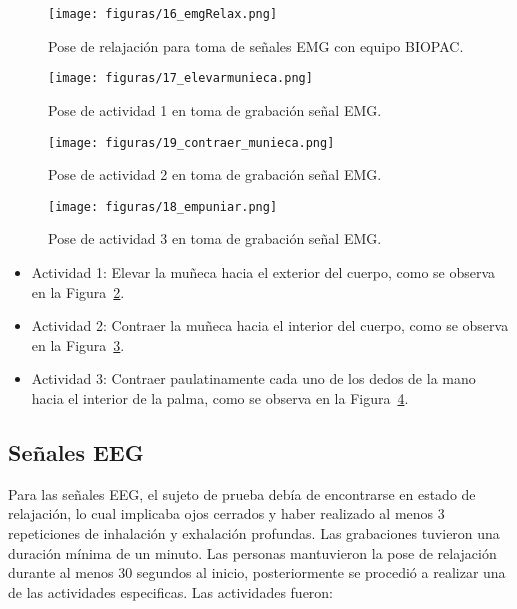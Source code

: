 \begin{figure}[t]
    \centering
    \texttt{[image: figuras/16\_emgRelax.png]}
    \caption{Pose de relajación para toma de señales EMG con equipo BIOPAC.}
    \label{fig:relax_emg}
\end{figure}

\begin{figure}[t]
    \centering
    \texttt{[image: figuras/17\_elevarmunieca.png]}
    \caption{Pose de actividad 1 en toma de grabación señal EMG.}
    \label{fig:actividad1_emg}
\end{figure}

\begin{figure}[H]
    \centering
    \texttt{[image: figuras/19\_contraer\_munieca.png]}
    \caption{Pose de actividad 2 en toma de grabación señal EMG.}
    \label{fig:actividad2_emg}
\end{figure}

\begin{figure}[H]
    \centering
    \texttt{[image: figuras/18\_empuniar.png]}
    \caption{Pose de actividad 3 en toma de grabación señal EMG.}
    \label{fig:actividad3_emg}
\end{figure}

\begin{itemize}    
    \item Actividad 1:
    Elevar la muñeca hacia el exterior del cuerpo, como se observa en la Figura~\ref{fig:actividad1_emg}.    
    \item Actividad 2:
    Contraer la muñeca hacia el interior del cuerpo, como se observa en la Figura~\ref{fig:actividad2_emg}.     
    \item Actividad 3:
    Contraer paulatinamente cada uno de los dedos de la mano hacia el interior de la palma, como se observa en la Figura~\ref{fig:actividad3_emg}.    
\end{itemize}



\subsection{Señales EEG}
Para las señales EEG, el sujeto de prueba debía de encontrarse en estado de relajación, lo cual implicaba ojos cerrados y haber realizado al menos 3 repeticiones de inhalación y exhalación profundas.
Las grabaciones tuvieron una duración mínima de un minuto. Las personas mantuvieron la pose de relajación durante al menos 30 segundos al inicio, posteriormente se procedió a realizar una de las actividades especificas. Las actividades fueron:

